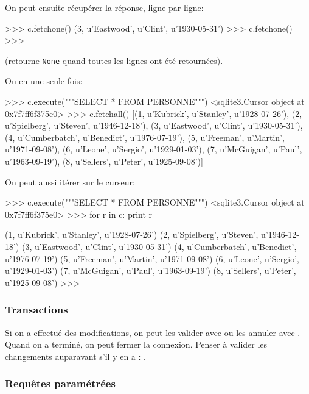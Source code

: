 On peut ensuite récupérer la réponse, ligne par ligne:
\begin{pyverbatim}
>>> c.fetchone()
(3, u'Eastwood', u'Clint', u'1930-05-31')
>>> c.fetchone()
>>>
\end{pyverbatim}
(retourne \lstinline{None} quand toutes les lignes ont été
retournées).

\begin{multicols}{2}
Ou en une seule fois:
{\small
\begin{pyverbatim}
>>> c.execute("""SELECT * FROM PERSONNE""")
<sqlite3.Cursor object at 0x7f7ff6f375e0>
>>> c.fetchall()
[(1, u'Kubrick', u'Stanley', u'1928-07-26'),
 (2, u'Spielberg', u'Steven', u'1946-12-18'),
 (3, u'Eastwood', u'Clint', u'1930-05-31'),
 (4, u'Cumberbatch', u'Benedict', u'1976-07-19'), 
 (5, u'Freeman', u'Martin', u'1971-09-08'), 
 (6, u'Leone', u'Sergio', u'1929-01-03'),
 (7, u'McGuigan', u'Paul', u'1963-09-19'), 
 (8, u'Sellers', u'Peter', u'1925-09-08')]
\end{pyverbatim}
}

On peut aussi itérer sur le curseur:

{\small
\begin{pyverbatim}
  >>> c.execute("""SELECT * FROM PERSONNE""")
<sqlite3.Cursor object at 0x7f7ff6f375e0>
>>> for r in c: 
      print r
    
(1, u'Kubrick', u'Stanley', u'1928-07-26')
(2, u'Spielberg', u'Steven', u'1946-12-18')
(3, u'Eastwood', u'Clint', u'1930-05-31')
(4, u'Cumberbatch', u'Benedict', u'1976-07-19')
(5, u'Freeman', u'Martin', u'1971-09-08')
(6, u'Leone', u'Sergio', u'1929-01-03')
(7, u'McGuigan', u'Paul', u'1963-09-19')
(8, u'Sellers', u'Peter', u'1925-09-08')
>>> 
\end{pyverbatim}
}
\end{multicols}

\subsubsection{Transactions}
Si on a effectué des modifications, on peut les valider avec 
ou les annuler avec . 
Quand on a terminé, on peut fermer la connexion. Penser à valider les
changements auparavant s'il y en a : .


\subsubsection{Requêtes paramétrées}

